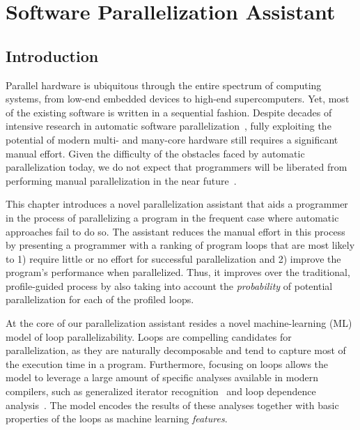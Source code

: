 \chapter{Software Parallelization Assistant}
\label{assistant}
\section{Introduction}


\quad Parallel hardware is ubiquitous through the entire spectrum of computing systems, from low-end embedded devices to high-end supercomputers.
%
Yet, most of the existing software is written in a sequential fashion.
%
Despite decades of intensive research in automatic software
parallelization~\cite{6813266}, fully exploiting the potential of modern multi- and many-core hardware still requires a significant manual effort.
%
Given the difficulty of the obstacles faced by automatic parallelization today, we do not expect that programmers will be liberated from performing manual parallelization in the near future~\cite{Larsen:2012:PML:2410141.2410600}.


This chapter introduces a novel parallelization assistant that aids a programmer in the process of parallelizing a program in the frequent case where automatic approaches fail to do so.
%
The assistant reduces the manual effort in this process by presenting a programmer with a ranking of program loops that are most likely to 1) require little or no effort for successful parallelization and 2) improve the program's performance when parallelized.
%
Thus, it improves over the traditional, profile-guided process by also taking into account the \emph{probability} of potential parallelization for each of the profiled loops.


At the core of our parallelization assistant resides a novel machine-learning (ML) model of loop parallelizability.
%
Loops are compelling candidates for parallelization, as they are naturally decomposable and tend to capture most of the execution time in a program.
%
Furthermore, focusing on loops allows the model to leverage a large amount of specific analyses available in modern compilers, such as generalized iterator recognition~\cite{Manilov:2018:GPI:3178372.3179511} and loop dependence analysis~\cite{Jensen:2017:ILD:3132652.3095754}.
%
The model encodes the results of these analyses together with basic properties of the loops as machine learning \textit{features}.

